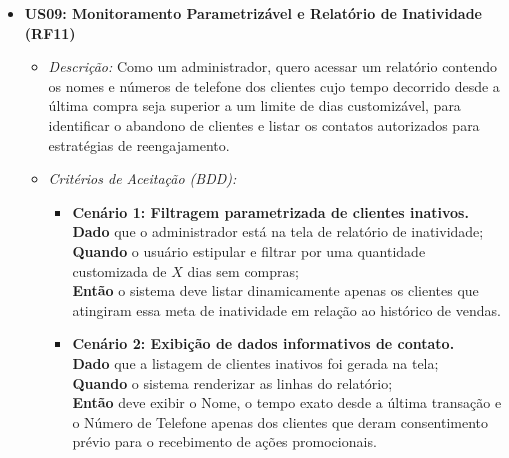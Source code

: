 \documentclass[
	12pt,				%
	openany,			%
	oneside,			%
	a4paper,			%
	english,			%
	french,				%
	spanish,			%
	brazil				%
	]{abntex2}
\begin{document}
\begin{itemize}
    \item \textbf{US09: Monitoramento Parametrizável e Relatório de Inatividade (RF11)}
    \begin{itemize}
        \item \textit{Descrição:} Como um administrador, quero acessar um relatório contendo os nomes e números de telefone dos clientes cujo tempo decorrido desde a última compra seja superior a um limite de dias customizável, para identificar o abandono de clientes e listar os contatos autorizados para estratégias de reengajamento.
        \item \textit{Critérios de Aceitação (BDD):}
        \begin{itemize}
            \item \textbf{Cenário 1: Filtragem parametrizada de clientes inativos.} \\
            \textbf{Dado} que o administrador está na tela de relatório de inatividade; \\
            \textbf{Quando} o usuário estipular e filtrar por uma quantidade customizada de $X$ dias sem compras; \\
            \textbf{Então} o sistema deve listar dinamicamente apenas os clientes que atingiram essa meta de inatividade em relação ao histórico de vendas.
            \item \textbf{Cenário 2: Exibição de dados informativos de contato.} \\
            \textbf{Dado} que a listagem de clientes inativos foi gerada na tela; \\
            \textbf{Quando} o sistema renderizar as linhas do relatório; \\
            \textbf{Então} deve exibir o Nome, o tempo exato desde a última transação e o Número de Telefone apenas dos clientes que deram consentimento prévio para o recebimento de ações promocionais.
        \end{itemize}
    \end{itemize}


\end{itemize}
\end{document}
